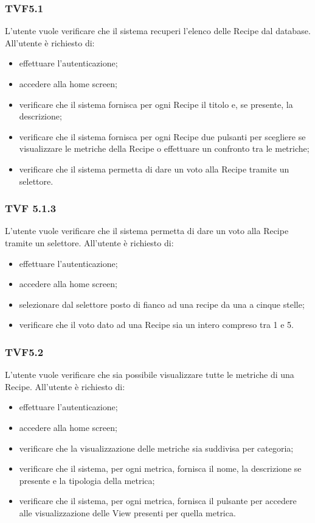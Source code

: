 		\subsubsection{TVF5.1}
			L'utente vuole verificare che il sistema recuperi l'elenco delle Recipe dal database. All'utente è richiesto di:
			\begin{itemize}
				\item effettuare l'autenticazione;
				\item accedere alla home screen;
				\item verificare che il sistema fornisca per ogni Recipe il titolo e, se presente, la descrizione;
				\item verificare che il sistema fornisca per ogni Recipe due pulsanti per scegliere se visualizzare le metriche della Recipe o effettuare un confronto tra le metriche;
				\item verificare che il sistema permetta di dare un voto alla Recipe tramite un selettore.
			\end{itemize}
			
		\subsubsection{TVF 5.1.3}
			L'utente vuole verificare che il sistema permetta di dare un voto alla Recipe tramite un selettore. All'utente è richiesto di:
			\begin{itemize}
				\item effettuare l'autenticazione;
				\item accedere alla home screen;
				\item selezionare dal selettore posto di fianco ad una recipe da una a cinque stelle;
				\item verificare che il voto dato ad una Recipe sia un intero compreso tra 1 e 5.
			\end{itemize}
					
		\subsubsection{TVF5.2}
			L'utente vuole verificare che sia possibile visualizzare tutte le metriche di una Recipe. All'utente è richiesto di:
			\begin{itemize}
				\item effettuare l'autenticazione;
				\item accedere alla home screen;
				\item verificare che la visualizzazione delle metriche sia suddivisa per categoria;
				\item verificare che il sistema, per ogni metrica, fornisca il nome, la descrizione se presente e la tipologia della metrica;
				\item verificare che il sistema, per ogni metrica, fornisca il pulsante per accedere alle visualizzazione delle View presenti per quella metrica.				
			\end{itemize}
			

